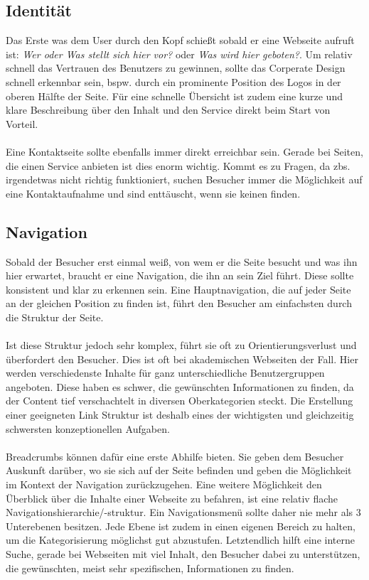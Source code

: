 \subsection{Identität}

Das Erste was dem User durch den Kopf schießt sobald er eine Webseite aufruft ist: \textit{\glqq Wer oder Was stellt sich hier vor?\grqq{}} oder \textit{\glqq Was wird hier geboten?\grqq{}}. Um relativ schnell das Vertrauen des Benutzers zu gewinnen, sollte das Corperate Design schnell erkennbar sein, bspw. durch ein prominente Position des Logos in der oberen Hälfte der Seite. Für eine schnelle Übersicht ist zudem eine kurze und klare Beschreibung über den Inhalt und den Service direkt beim Start von Vorteil.\\
\\
Eine Kontaktseite sollte ebenfalls immer direkt erreichbar sein. Gerade bei Seiten, die einen Service anbieten ist dies enorm wichtig. Kommt es zu Fragen, da zbs. irgendetwas nicht richtig funktioniert, suchen Besucher immer die Möglichkeit auf eine Kontaktaufnahme und sind enttäuscht, wenn sie keinen finden.


\subsection{Navigation}

Sobald der Besucher erst einmal weiß, von wem er die Seite besucht und was ihn hier erwartet, braucht er eine Navigation, die ihn an sein Ziel führt. Diese sollte konsistent und klar zu erkennen sein. Eine Hauptnavigation, die auf jeder Seite an der gleichen Position zu finden ist, führt den Besucher am einfachsten durch die Struktur der Seite.\\
\\
Ist diese Struktur jedoch sehr komplex, führt sie oft zu Orientierungsverlust und überfordert den Besucher. Dies ist oft bei akademischen Webseiten der Fall. Hier werden verschiedenste Inhalte für ganz unterschiedliche Benutzergruppen angeboten. Diese haben es schwer, die gewünschten Informationen zu finden, da der Content tief verschachtelt in diversen Oberkategorien steckt. Die Erstellung einer geeigneten Link Struktur ist deshalb eines der wichtigsten und gleichzeitig schwersten konzeptionellen Aufgaben.\\
\\
\Gls{Breadcrumb}s können dafür eine erste Abhilfe bieten. Sie geben dem Besucher Auskunft darüber, wo sie sich auf der Seite befinden und geben die Möglichkeit im Kontext der Navigation zurückzugehen. Eine weitere Möglichkeit den Überblick über die Inhalte einer Webseite zu befahren, ist eine relativ flache Navigationshierarchie/-struktur. Ein Navigationsmenü sollte daher nie mehr als 3 Unterebenen besitzen. Jede Ebene ist zudem in einen eigenen Bereich zu halten, um die Kategorisierung möglichst gut abzustufen. Letztendlich hilft eine interne Suche, gerade bei Webseiten mit viel Inhalt, den Besucher dabei zu unterstützen, die gewünschten, meist sehr spezifischen, Informationen zu finden.

